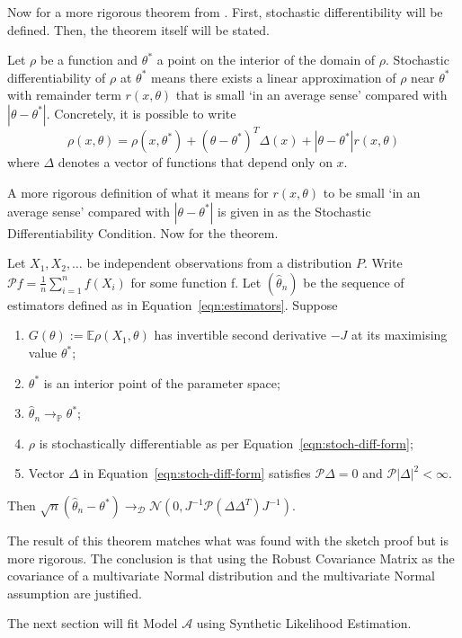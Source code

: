 Now for a more rigorous theorem from \cite{pollard_1985}. First, stochastic differentibility will be defined. Then, the theorem itself will be stated.

\begin{definition}
    Let $\rho$ be a function and $\theta^*$ a point on the interior of the domain of $\rho$. Stochastic differentiability of $\rho$ at $\theta^*$ means there exists a linear approximation of $\rho$ near $\theta^*$ with remainder term $r(x,\theta)$ that is small `in an average sense' compared with $|\theta - \theta^*|$. Concretely, it is possible to write
    \begin{equation}
        \label{eqn:stoch-diff-form}
        \rho(x, \theta) = \rho(x, \theta^*) + (\theta - \theta^*)^T \Delta(x) + |\theta - \theta^*|r(x,\theta)
    \end{equation}
    where $\Delta$ denotes a vector of functions that depend only on $x$.
\end{definition}

A more rigorous definition of what it means for $r(x,\theta)$ to be small `in an average sense' compared with $|\theta - \theta^*|$ is given in \cite{pollard_1985} as the Stochastic Differentiability Condition. Now for the theorem.

\begin{theorem}
\label{the:aymp}
    Let $X_1, X_2, \ldots$ be independent observations from a distribution $P$. Write $\mathcal{P}f = \frac{1}{n} \sum_{i=1}^n f(X_i)$ for some function f. Let $(\hat{\theta}_n)$ be the sequence of estimators defined as in Equation~\ref{eqn:estimators}. Suppose
    \begin{enumerate}
        \item $G(\theta) := \mathbb{E}\rho(X_1, \theta)$ has invertible second derivative $-J$ at its maximising value $\theta^*$;
        \item $\theta^*$ is an interior point of the parameter space;
        \item $\hat{\theta}_n \to_{\mathbb{P}} \theta^*$;
        \item $\rho$ is stochastically differentiable as per Equation~\ref{eqn:stoch-diff-form};
        \item Vector $\Delta$ in Equation~\ref{eqn:stoch-diff-form} satisfies $\mathcal{P}\Delta = 0$ and $\mathcal{P}|\Delta|^2 < \infty$.
    \end{enumerate}
    Then $\sqrt{n}(\hat{\theta}_n - \theta^*) \to_{\mathcal{D}} \mathcal{N}(0, J^{-1}\mathcal{P}(\Delta \Delta^T)J^{-1})$.
\end{theorem}

The result of this theorem matches what was found with the sketch proof but is more rigorous. The conclusion is that using the Robust Covariance Matrix as the covariance of a multivariate Normal distribution and the multivariate Normal assumption are justified.

The next section will fit Model $\mathcal{A}$ using Synthetic Likelihood Estimation.